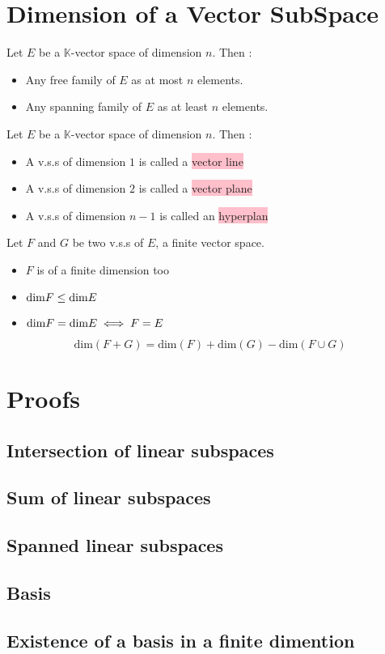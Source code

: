 \documentclass[notitlepage]{math}
\begin{document}
\section{Dimension of a Vector SubSpace}
Let $E$ be a $\mathbb{K}$-vector space of dimension $n$. Then :
\begin{itemize}
    \item Any free family of $E$ as at most $n$ elements.
    \item Any spanning family of $E$ as at least $n$ elements.
\end{itemize}
Let $E$ be a $\mathbb{K}$-vector space of dimension $n$. Then :
\begin{itemize}
    \item A v.s.s of dimension $1$ is called a \colorbox{pink}{vector line}
    \item A v.s.s of dimension $2$ is called a \colorbox{pink}{vector plane}
    \item A v.s.s of dimension $n-1$ is called an \colorbox{pink}{hyperplan}
\end{itemize}
Let $F$ and $G$ be two v.s.s of $E$, a finite vector space.
\begin{itemize}
    \item $F$ is of a finite dimension too
    \item $\text{dim}\space F \leq \text{dim}\space E$
    \item $\text{dim}\space F = \text{dim}\space E \iff F = E$
\end{itemize}

\[\text{dim}(F + G)  = \text{dim}(F) + \text{dim}(G) - \text{dim}(F \cup G)\]
\section{Proofs}
\subsection{Intersection of linear subspaces}
\subsection{Sum of linear subspaces}
\subsection{Spanned linear subspaces}
\subsection{Basis}
\subsection{Existence of a basis in a finite dimention}
\end{document}
